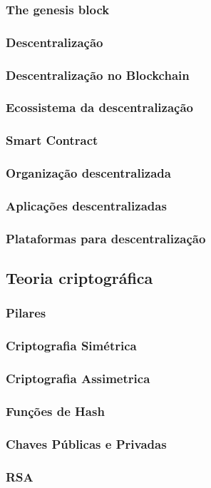         \subsubsection{The genesis block}
    
    \subsubsection{Descentralização}

    
        \subsubsection{Descentralização no Blockchain}

        \subsubsection{Ecossistema da descentralização}

        \subsubsection{Smart Contract}

        \subsubsection{Organização descentralizada}

        \subsubsection{Aplicações descentralizadas}

        \subsubsection{Plataformas para descentralização}

\subsection{Teoria criptográfica}

    \subsubsection{Pilares}

    \subsubsection{Criptografia Simétrica}

    \subsubsection{Criptografia Assimetrica}
    
    \subsubsection{Funções de Hash}

    \subsubsection{Chaves Públicas e Privadas}

        \subsubsection{RSA}